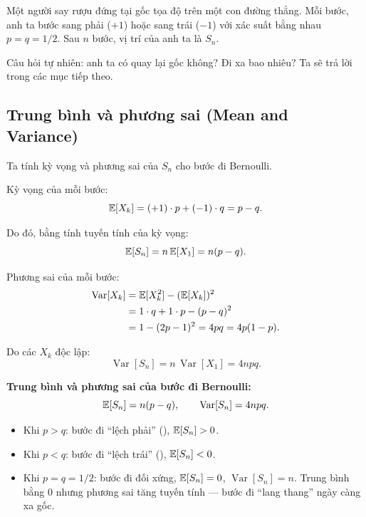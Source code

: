 \begin{example}
\label{ex:drunkard}
Một người say rượu đứng tại gốc tọa độ trên một con đường thẳng.
Mỗi bước, anh ta bước sang phải ($+1$) hoặc sang trái ($-1$) với xác suất bằng nhau $p = q = 1/2$.
Sau $n$ bước, vị trí của anh ta là $S_n$.

Câu hỏi tự nhiên: anh ta có quay lại gốc không? Đi xa bao nhiêu? Ta sẽ trả lời trong các mục tiếp theo.
\end{example}

\subsection{Trung bình và phương sai (Mean and Variance)}
\label{subsec:mean-var}

Ta tính kỳ vọng và phương sai của $S_n$ cho bước đi Bernoulli.

Kỳ vọng của mỗi bước:
\[
  \mathbb{E}[X_k] = (+1) \cdot p + (-1) \cdot q = p - q.
\]

Do đó, bằng tính tuyến tính của kỳ vọng:
\begin{equation}\label{eq:mean-Sn}
  \mathbb{E}[S_n] = n\,\mathbb{E}[X_1] = n(p - q).
\end{equation}

Phương sai của mỗi bước:
\begin{align*}
  \operatorname{Var}[X_k] &= \mathbb{E}[X_k^2] - (\mathbb{E}[X_k])^2 \\
  &= 1 \cdot q + 1 \cdot p - (p-q)^2 \\
  &= 1 - (2p-1)^2 = 4pq = 4p(1-p).
\end{align*}

Do các $X_k$ độc lập:
\begin{equation}\label{eq:var-Sn}
  \operatorname{Var}[S_n] = n\,\operatorname{Var}[X_1] = 4npq.
\end{equation}

\begin{congthuc}
\textbf{Trung bình và phương sai của bước đi Bernoulli:}
\[
  \mathbb{E}[S_n] = n(p - q), \qquad \operatorname{Var}[S_n] = 4npq.
\]
\begin{itemize}[nosep]
  \item Khi $p > q$: bước đi ``lệch phải'' (), $\mathbb{E}[S_n] > 0$.
  \item Khi $p < q$: bước đi ``lệch trái'' (), $\mathbb{E}[S_n] < 0$.
  \item Khi $p = q = 1/2$: bước đi đối xứng, $\mathbb{E}[S_n] = 0$, $\operatorname{Var}[S_n] = n$.
    Trung bình bằng $0$ nhưng phương sai tăng tuyến tính --- bước đi ``lang thang'' ngày càng xa gốc.
\end{itemize}
\end{congthuc}

